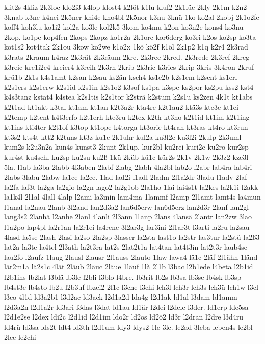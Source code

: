 {klit2s
4kliz
2k3loc
klo2i3
k4lop
klost4
k2löt
k1lu
kluf2
2k1lüc
2kly
2k1m
k2n2
3knab
k3ne
k4nei
2k5ner
kni4e
kno4bl
2k5nor
k3nu
3knü
1ko
ko2al
2kobj
2k1o2fe
koff4
koh3lu
ko1i2
kol2a
ko3le
kol2k5
3kom
ko4mu
k2on
ko3n2e
kons4
ko3nu
2kop.
ko1pe
kop4fen
2kops
2kopz
ko1r2a
2k1orc
kor6derg
ko3ri
k2os
ko2sp
ko3ta
kot1s2
kot4tak
2k1ou
3kow
ko2we
k1o2x
1kö
kö2f
k1öl
2k1p2
k1q
k2r4
2k3rad
k3rats
2kraum
k4raz
2k3rät
2k3räum
2kre.
2k3rec
2kred.
2k3rede
2k3ref
2kreg
k3reic
kre1i2e4
kreier4
k3reih
2k3rh
2krib
2k3ric
k3ries
2krip
3kris
3k4ron
2kruf
krü1b
2k1s
k4s1amt
k2san
k2sau
ks2än
ksch4
ks1e2b
k2s1em
k2sent
ks1erl
k2s1ers
k2s1erw
k2s1id
k2s1in
k2s1o2
k3sof
ks1pa
k3spe
ks2por
ks2pu
kss2
kst4
k4s3tanz
kstat4
k4stea
k2s1tis
k2s1tor
k2strä
k2stum
k2s1u
ks2zen
4k1t
kt1abs
k2t1ad
kt1akt
k3tal
kt1am
kt1an
k2t3a2r
kta4re
k2t1au2
ktä3s
kte3e
kt1ei
k2temp
k2tent
k4t3erfo
k2t1erh
kte3ru
k2tex
k2th
kt3ho
k2t1id
kt1im
k2t1ing
kt1ins
kti4ter
k2t1of
k3top
kt1ope
k4torga
kt3orie
kt4ran
kt3ras
kt4ro
kt3run
kt3s2
kts4t
ktt2
k2tuns
kt3z
ku1c
2k1uhr
kul2a
ku3l2e
ku3l2i
2kulp
2k3uml
kum2s
k2u3n2a
kun4s
kunst3
2kunt
2k1up.
kur2bl
ku2rei
kuri2e
ku2ro
kur2sp
kur4st
ku4schl
ku2sp
ku2su
ku2ß
1kü
2küb
kü1c
kür2s
2k1v
2k1w
2k3z2
kze3l
5la.
l1ab
la3ba
2labb
4l3aben
2labf
2labg
2labh
4la2bl
lab2o
l2abr
lab4ra
lab4ri
2labs
3labu
2labw
la1ce
la2ce.
1lad
lad2i
l1adl
2ladm
2l1a2dr
3ladu
l1adv
2laf
la2fa
laf3t
la2ga
la2gio
la2gn
lago2
la2g1ob
2la1ho
1lai
lai4s1t
la2kes
la2k1i
l2akk
la1k4l
2l1al
4lall
4lalp
l2ami
la3min
lam4ma
1lammf
l2amp
2l1amt
lamt4s
la4mun
l1anal
la2nau
2lanb
3l2and
lan2d3a2
lan6d5erw
lan6d5erz
lan2d3r
2lanf
lan2gl
lang3s2
2lanhä
l2anhe
2lanl
4lanli
2l3ann
l1anp
2lans
4lansä
2lantr
lan2zw
3lao
l1a2po
lap4pl
la2r1an
la2r1ei
la4rene
3l2ar3g
lar3ini
2l1ar3t
l3arti
la2ru
la2sau
4lasd
la5se
2lash
2lasi
la2so
2la2sp
3lasser
la2sta
last1o
la2str
las3tur
la2stü
la2ß3
lat2a
la3te
la4tel
2l3ath
la2t3ra
lat2s
2lat2t1a
lat4tan
lat4t3in
lat2t3r
laub4se
lau2fo
l2aufz
1laug
2lausl
2lausr
2l1auss
2lauto
1law
lawa4
lä1c
2läf
2l1ähn
1länd
lär2m1a
lä2s1c
4lät
2läub
2läuc
2läue
1läuf
1là
2l1b
l3bac
l2b1ede
l4beta
l2b1id
l2b1ins
lb2lat
l3blä
lb3le
l2bli
l3blo
l4bre.
lb3rit
lb2s
lb3sa
lb3se
lb4sk
lb3sp
lb4st3e
lb4sto
lb2u
l2b3uf
lbzei2
2l1c
l3che
l3chi
lch3l
lch3r
lch3s
lch3ü
lch1w
l3cl
l3co
4l1d
ld3a2b1
l3d2ac
ld3ack
l2d1a2d
lda4g
l2d1ak
ld1al
l3dam
ld1amm
l2d3a2n
l2d1a2r
ld3ari
l3das
l3dat
ld1au
ld1är
l2dei
l2dele
l3der.
ld1erp
lde5sa
l2d1e2se
l2dex
ldi2c
l2d1id
l2d1im
ldo2r
ld2os
ld2ö2
ld3r
l2dran
l2dre
l3d4ru
ld4rü
ld3sa
lds2t
ldt4
ld3th
l2d1um
ldy3
ldys2
1le
3le.
le2ad
3leba
leben4s
le2bl
2lec
le2chi
}

